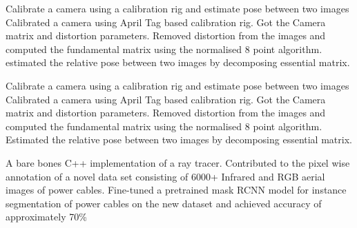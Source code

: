 \resumeItemListStart
{}
{Calibrate a camera using a calibration rig and estimate pose between two images}
{Calibrated a camera using April Tag based calibration rig. Got the Camera matrix and distortion parameters.}
{Removed distortion from the images and computed the fundamental matrix using the normalised 8 point algorithm.}
{estimated the relative pose between two images by decomposing essential matrix.}
\resumeItemListEnd

\resumeItemListStart
{}
{Calibrate a camera using a calibration rig and estimate pose between two images}
{Calibrated a camera using April Tag based calibration rig. Got the Camera matrix and distortion parameters.}
{Removed distortion from the images and computed the fundamental matrix using the normalised 8 point algorithm.}
{Estimated the relative pose between two images by decomposing essential matrix.}
\resumeItemListEnd

\resumeItemListStart
{}
\resumeItemListEnd

\resumeItemListStart
{}
\resumeItemListEnd

{A bare bones C++ implementation of a ray tracer.}
\resumeItemListStart
{}
{Contributed to the pixel wise annotation of a novel data set consisting of 6000+ Infrared and RGB aerial images of power cables.}
{Fine-tuned a pretrained mask RCNN model for instance segmentation of power cables on the new dataset and achieved accuracy of approximately 70\%}
\resumeItemListEnd

\resumeSubHeadingListEnd
